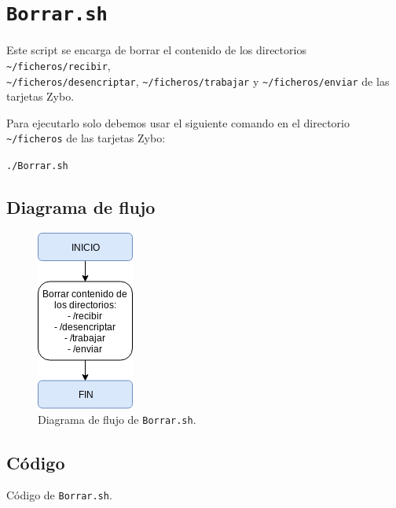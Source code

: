 \section{\texttt{Borrar.sh}}
\hypertarget{ScriptBorrar}{}
Este script se encarga de borrar el contenido de los directorios \texttt{\textasciitilde/ficheros/recibir},\\ \texttt{\textasciitilde/ficheros/desencriptar}, \texttt{\textasciitilde/ficheros/trabajar} y \texttt{\textasciitilde/ficheros/enviar} de las tarjetas Zybo.

Para ejecutarlo solo debemos usar el siguiente comando en el directorio \texttt{\textasciitilde/ficheros} de las tarjetas Zybo:
\begin{center}
	\texttt{./Borrar.sh}
\end{center}

\subsection{Diagrama de flujo}
\begin{figure}[h]
	\centering
	\includegraphics[scale=0.9]{Anexos/Anexo3/Diagramas/Borrar.png}
	\caption{Diagrama de flujo de \texttt{Borrar.sh}.}
	\label{Diagrama de flujo de Borrar.sh}
\end{figure}

\subsection{Código}

\begin{center}
	Código de \texttt{Borrar.sh}.
\end{center}